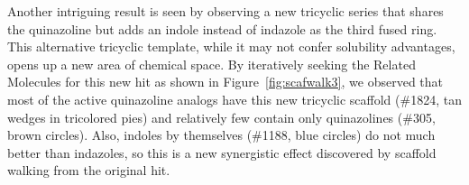 \documentclass[11pt,letterpaper]{article}
\newcommand*\fref[1]{Figure~\ref{fig:#1}}
\begin{document}
Another intriguing result is seen by observing a new tricyclic series that shares the quinazoline but adds an indole instead of indazole as the third fused ring. This alternative tricyclic template, while it may not confer solubility advantages, opens up a new area of chemical space. By iteratively seeking the Related Molecules for this new hit as shown in \fref{scafwalk3}, we observed that most of the active quinazoline analogs have this new tricyclic scaffold (\#1824, tan wedges in tricolored pies) and relatively few contain only quinazolines (\#305, brown circles). Also, indoles by themselves (\#1188, blue circles) do not much better than indazoles, so this is a new synergistic effect discovered by scaffold walking from the original hit.            

\newpage




\end{document}
